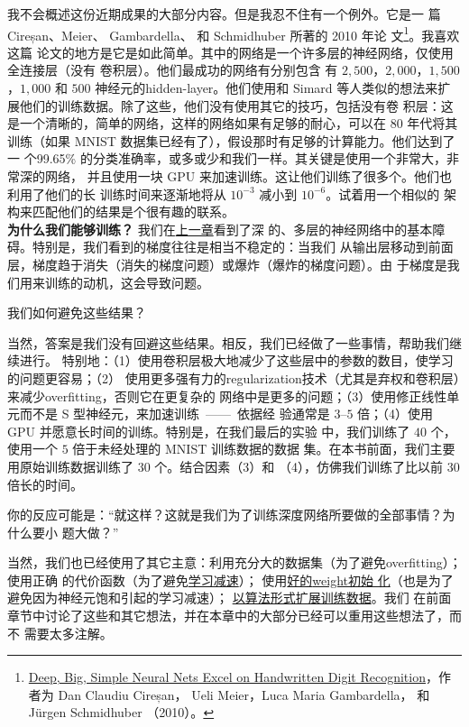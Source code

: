 我不会概述这份近期成果的大部分内容。但是我忍不住有一个例外。它是一
篇 Cireșan、Meier、 Gambardella、 和 Schmidhuber 所著的 2010 年论
文\footnote{\href{http://arxiv.org/abs/1003.0358}{Deep, Big, Simple Neural Nets
    Excel on Handwritten Digit Recognition}，作者为 Dan Claudiu Cireșan， Ueli
  Meier，Luca Maria Gambardella， 和 Jürgen Schmidhuber （2010）。}。我喜欢这篇
论文的地方是它是如此简单。其中的网络是一个许多层的神经网络，仅使用全连接层（没有
卷积层）。他们最成功的网络有分别包含
有 $2,500$，$2,000$，$1,500$，$1,000$ 和 $500$ 神经元的\gls*{hidden-layer}。他们使用和 Simard
等人类似的想法来扩展他们的训练数据。除了这些，他们没有使用其它的技巧，包括没有卷
积层：这是一个清晰的，简单的网络，这样的网络如果有足够的耐心，可以在 80 年代将其
训练（如果 MNIST 数据集已经有了），假设那时有足够的计算能力。他们达到了一
个99.65\% 的分类准确率，或多或少和我们一样。其关键是使用一个非常大，非常深的网络，
并且使用一块 GPU 来加速训练。这让他们训练了很多个\epochs{}。他们也利用了他们的长
训练时间来逐渐地将\learningrate{}从 $10^{-3}$ 减小到 $10^{-6}$。试着用一个相似的
架构来匹配他们的结果是个很有趣的联系。\\

\textbf{为什么我们能够训练？} 我们在\hyperref[ch:WhyHardToTrain]{上一章}看到了深
的、多层的神经网络中的基本障碍。特别是，我们看到的梯度往往是相当不稳定的：当我们
从输出层移动到前面层，梯度趋于消失（消失的梯度问题）或爆炸（爆炸的梯度问题）。由
于梯度是我们用来训练的动机，这会导致问题。

我们如何避免这些结果？

当然，答案是我们没有回避这些结果。相反，我们已经做了一些事情，帮助我们继续进行。
特别地：（1）使用卷积层极大地减少了这些层中的参数的数目，使学习的问题更容易；（2）
使用更多强有力的\gls*{regularization}技术（尤其是弃权和卷积层）来减少\gls*{overfitting}，否则它在更复杂的
网络中是更多的问题；（3）使用修正线性单元而不是 S 型神经元，来加速训练~——~依据经
验通常是 $3$--$5$ 倍；（4）使用 GPU 并愿意长时间的训练。特别是，在我们最后的实验
中，我们训练了 $40$ 个\epochs{}，使用一个 $5$ 倍于未经处理的 MNIST 训练数据的数据
集。在本书前面，我们主要用原始训练数据训练了 $30$ 个\epochs{}。结合因素（3）和
（4），仿佛我们训练了比以前 $30$ 倍长的时间。

你的反应可能是：“就这样？这就是我们为了训练深度网络所要做的全部事情？为什么要小
题大做？”

当然，我们也已经使用了其它主意：利用充分大的数据集（为了避免\gls*{overfitting}）；使用正确
的代价函数（为了避免\hyperref[sec:the_cross-entropy_cost_function]{学习减速}）；
使用\hyperref[how_to_choose_a_neural_network's_hyper-parameters]{好的\gls*{weight}初始
  化}（也是为了避免因为神经元饱和引起的学习减速）；%
\hyperref[sec:other_techniques_for_regularization]{以算法形式扩展训练数据}。我们
在前面章节中讨论了这些和其它想法，并在本章中的大部分已经可以重用这些想法了，而不
需要太多注解。

